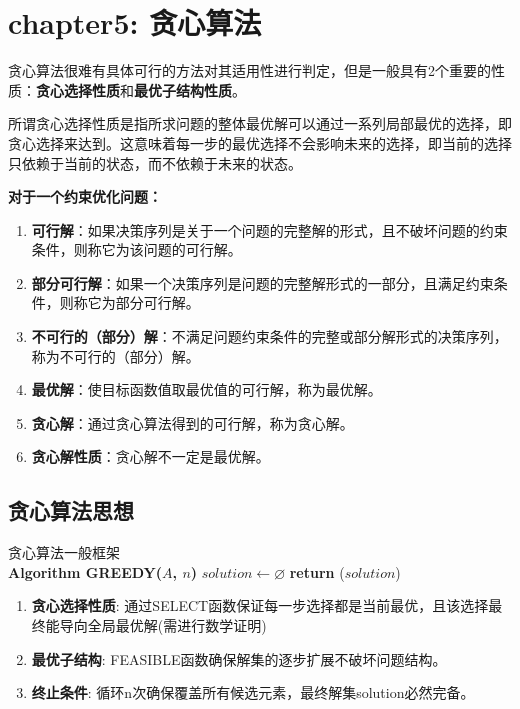 \documentclass[./../main.tex]{subfiles}
\begin{document}
\section{chapter5: 贪心算法}
贪心算法很难有具体可行的方法对其适用性进行判定，但是一般具有2个重要的性质：\textbf{贪心选择性质}和\textbf{最优子结构性质}。

所谓贪心选择性质是指所求问题的整体最优解可以通过一系列局部最优的选择，即贪心选择来达到。这意味着每一步的最优选择不会影响未来的选择，即当前的选择只依赖于当前的状态，而不依赖于未来的状态。

\textbf{对于一个约束优化问题：}
\begin{enumerate}
    \item \textbf{可行解}：如果决策序列是关于一个问题的完整解的形式，且不破坏问题的约束条件，则称它为该问题的可行解。
    
    \item \textbf{部分可行解}：如果一个决策序列是问题的完整解形式的一部分，且满足约束条件，则称它为部分可行解。
    
    \item \textbf{不可行的（部分）解}：不满足问题约束条件的完整或部分解形式的决策序列，称为不可行的（部分）解。
    
    \item \textbf{最优解}：使目标函数值取最优值的可行解，称为最优解。
    
    \item \textbf{贪心解}：通过贪心算法得到的可行解，称为贪心解。
    
    \item \textbf{贪心解性质}：贪心解不一定是最优解。
\end{enumerate}
\subsection{贪心算法思想}
\begin{algorithm}[H]
    \SetAlgoLined
    \DontPrintSemicolon
    
    \BlankLine
    \textnormal{贪心算法一般框架} \\
    \textbf{Algorithm GREEDY($A$, $n$)} \;
    $solution \leftarrow \varnothing$ \;
    \textbf{return} ($solution$) \;
    \caption{贪心算法通用框架}
\end{algorithm}
\begin{enumerate}
    \item \textbf{贪心选择性质}: 通过SELECT函数保证每一步选择都是当前最优，且该选择最终能导向全局最优解(需进行数学证明)
    \item \textbf{最优子结构}: FEASIBLE函数确保解集的逐步扩展不破坏问题结构。
    \item \textbf{终止条件}: 循环n次确保覆盖所有候选元素，最终解集solution必然完备。
\end{enumerate}
\end{document}
